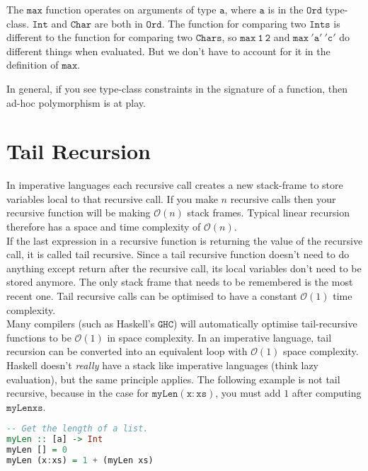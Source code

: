 \documentclass[a4paper,12pt]{article}
\newcommand{\keywadj}[1]{\mathtt{#1}}
\begin{document}
\noindent
The $\keywadj{max}$ function operates on arguments of type $\keywadj{a}$, where $\keywadj{a}$ is in the $\keywadj{Ord}$ type-class. $\keywadj{Int}$ and $\keywadj{Char}$ are both in $\keywadj{Ord}$. The function for comparing two $\keywadj{Ints}$ is different to the function for comparing two $\keywadj{Chars}$, so $\keywadj{max~1~2}$ and $\keywadj{max~'a'~'c'}$ do different things when evaluated. But we don't have to account for it in the definition of $\keywadj{max}$.

\noindent
In general, if you see type-class constraints in the signature of a function, then ad-hoc polymorphism is at play.


\section{Tail Recursion}

\noindent
In imperative languages each recursive call creates a new stack-frame to store variables local to that recursive call. If you make $n$ recursive calls then your recursive function will be making $\mathcal{O}(n)$ stack frames. Typical linear recursion therefore has a space and time complexity of $\mathcal{O}(n)$. \\

\noindent
If the last expression in a recursive function is returning the value of the recursive call, it is called tail recursive. Since a tail recursive function doesn't need to do anything except return after the recursive call, its local variables don't need to be stored anymore. The only stack frame that needs to be remembered is the most recent one. Tail recursive calls can be optimised to have a constant $\mathcal{O}(1)$ time complexity. \\

\noindent
Many compilers (such as Haskell's $\keywadj{GHC}$) will automatically optimise tail-recursive functions to be $\mathcal{O}(1)$ in space complexity. In an imperative language, tail recursion can be converted into an equivalent loop with $\mathcal{O}(1)$ space complexity. \\

\noindent
Haskell doesn't \textit{really} have a stack like imperative languages (think lazy evaluation), but the same principle applies. The following example is not tail recursive, because in the case for $\keywadj{myLen (x:xs)}$, you must add $1$ after computing $\keywadj{myLen xs}$. \\

\begin{lstlisting}[language=Haskell]
-- Get the length of a list.
myLen :: [a] -> Int
myLen [] = 0
myLen (x:xs) = 1 + (myLen xs)
\end{lstlisting}
\end{document}
